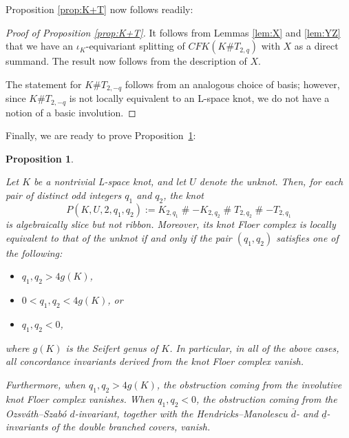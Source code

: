 \documentclass[11pt, reqno]{amsart}
\newtheorem{proposition}[theorem]{Proposition}
\theoremstyle{definition}
\theoremstyle{remark}
\def\CFK{\mathit{CFK}}
\numberwithin{equation}{section}
\begin{document}
Proposition \ref{prop:K+T} now follows readily:
\begin{proof}[Proof of Proposition \ref{prop:K+T}]
It follows from Lemmas \ref{lem:X} and \ref{lem:YZ} that we have an $\iota_K$-equivariant splitting of $\CFK(K \# T_{2,q})$ with $X$ as a direct summand. The result now follows from the description of $X$. 

The statement for $K \# T_{2,-q}$ follows from an analogous choice of basis; however, since $K \# T_{2,-q}$ is not locally equivalent to an L-space knot, we do not have a notion of a basic involution.
\end{proof}


Finally, we are ready to prove Proposition~\ref{prop:examples}:

\setcounter{proposition}{1}
\renewcommand{\theproposition}{1.4}
\begin{proposition}\label{prop:examples}


Let $K$ be a nontrivial L-space knot, and let $U$ denote the unknot. Then, for each pair of distinct odd integers $q_1$ and $q_2$, the knot
\[
P(K, U, 2, q_1, q_2) := K_{2,q_1} \mathbin{\#} -K_{2,q_2} \mathbin{\#} T_{2,q_2} \mathbin{\#} -T_{2,q_1}
\]
is algebraically slice but not ribbon. 
Moreover, its knot Floer complex  is locally equivalent to that of the unknot if and only if the pair $(q_1, q_2)$ satisfies one of the following:
\begin{itemize}
    \item $q_1, q_2 > 4g(K)$,
    \item $0 < q_1, q_2 < 4g(K)$, or
    \item $q_1, q_2 < 0$,
\end{itemize}
where $g(K)$ is the Seifert genus of $K$. In particular, in all of the above cases, all concordance invariants derived from the knot Floer complex vanish.


Furthermore, when $q_1, q_2 > 4g(K)$, the obstruction coming from the involutive knot Floer complex vanishes. When $q_1, q_2 < 0$, the obstruction coming from the Ozsv\'{a}th--Szab\'{o} $d$-invariant, together with the Hendricks--Manolescu $\overline{d}$- and $\underline{d}$-invariants of the double branched covers, vanish.


\end{proposition}
\renewcommand{\theproposition}{\thesection.\arabic{proposition}}
\end{document}
